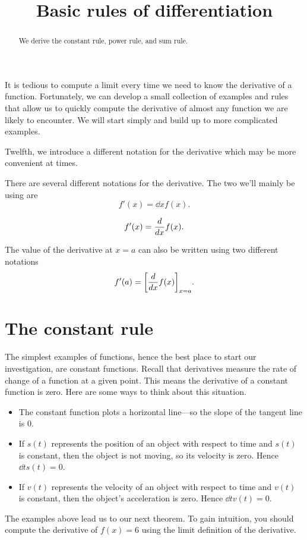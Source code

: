 \documentclass{ximera}
\title[Dig-In:]{Basic rules of differentiation}
\begin{document}
\begin{abstract}
  We derive the constant rule, power rule, and sum rule. 
\end{abstract}
\maketitle

It is tedious to compute a limit every time we need to know the
derivative of a function.  Fortunately, we can develop a small
collection of examples and rules that allow us to quickly compute the
derivative of almost any function we are likely to encounter.  We will
start simply and build up to more complicated examples.



Twelfth, we introduce a different notation for the derivative which may be more convenient at times.


\begin{definition}
  There are several different notations for the derivative.  The two we'll mainly be using are
   \[
 f'(x)= \dd{x} f(x).
  \]
  
     \[
 f'(x)= \frac{d}{\mathop{}\!d x} f(x).
  \]
  
  
  The value of the derivative at $x=a$ can also be written using two different notations
  \[
 f'(a)= \bigg[ \frac{d}{\mathop{}\!d x} f(x) \bigg]_{x=a}. 
  \]
\end{definition}




\section{The constant rule}

The simplest examples of functions, hence the best place to start our
investigation, are constant functions.  Recall that derivatives
measure the rate of change of a function at a given point. This means the
derivative of a constant function is zero. Here are some ways to think about
this situation.
\begin{itemize}
\item The constant function plots a horizontal line---so the slope of
  the tangent line is $0$.
\item If $s(t)$ represents the position of an object with respect to
  time and $s(t)$ is constant, then the object is not moving, so its
  velocity is zero. Hence $\dd{t} s(t) = 0$.
\item If $v(t)$ represents the velocity of an object with respect to
  time and $v(t)$ is constant, then the object's acceleration is
  zero. Hence $\dd{t} v(t) = 0$.
\end{itemize}
The examples above lead us to our next theorem.
To gain intuition, you should compute the derivative of
  $f(x) = 6$ using the limit definition of the derivative.
\end{document}
